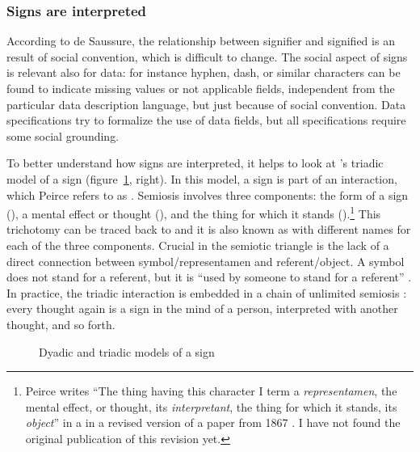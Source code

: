 \pagebreak

\subsubsection{Signs are interpreted}

According to de Saussure, the relationship between signifier and signified is
an  result of social convention, which is
difficult to change.  The social aspect of signs is relevant also for data: for
instance hyphen, dash, or similar characters can be found to indicate missing
values or not applicable fields, independent from the particular data description
language, but just because of social convention. Data specifications try to
formalize the use of data fields, but all specifications require some social
grounding. 

To better understand how signs are interpreted, it helps to look at
's triadic model of a sign
(figure~\ref{fig:signmodels}, right).  In this model, a sign is part of an
interaction, which Peirce refers to as . Semiosis involves three
components: the form of a sign
(), a mental effect or thought
(), and the thing for which it
stands ().\footnote{Peirce writes
``The thing having this character I term a \emph{representamen}, the mental
effect, or thought, its \emph{interpretant}, the thing for which it stands, its
\emph{object}'' in a in a revised version of a paper from 1867 \cite[paragraph
564]{Peirce1931}. I have not found the original publication of this revision
yet.} This trichotomy can be traced back to  and it is also
known as  with different names for each of the three
components. Crucial in the semiotic triangle is
the lack of a direct connection between symbol/representamen and
referent/object. A symbol does not stand for a referent, but it is ``used by
someone to stand for a referent'' \cite[p.  11]{Ogden1923}. In practice, the
triadic interaction is embedded in a chain of unlimited semiosis
\cite{Eco1979}: every thought again is a sign in the mind of a person,
interpreted with another thought, and so forth. 

\begin{figure}
\centering
{}
\caption{Dyadic and triadic models of a sign}
\label{fig:signmodels}
\end{figure}

